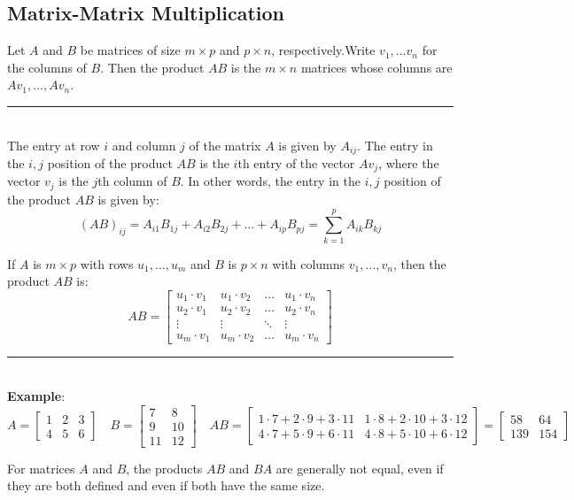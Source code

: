 \documentclass[a4paper, 9pt]{extarticle}
\begin{document}
\subsection*{Matrix-Matrix Multiplication}
\begin{definitionbox}{}{}
  Let $A$ and $B$ be matrices of size $m \times p$ and $p \times n$, respectively.Write $v_1, \ldots v_n$ for the columns of $B$. Then the product $AB$ is the $m \times n$ matrices whose columns are $Av_1 , \ldots, Av_n$.
  \\ \rule{\textwidth}{1px} \\
  The entry at row $i$ and column $j$ of the matrix $A$ is given by $A_{ij}$. The entry in the $i,j$ position of the product $AB$ is the $i$th entry of the vector $Av_j$, where the vector $v_j$ is the $j$th column of $B$. In other words, the entry in the $i,j$ position of the product $AB$ is given by:
  $$
    (AB)_{ij} = A_{i1}B_{1j} + A_{i2}B_{2j} + \ldots + A_{ip}B_{pj} = \sum_{k=1}^p A_{ik}B_{kj}
  $$
\end{definitionbox}
\begin{definitionbox}{}{}
  If $A$ is $m \times p$ with rows $u_1, \ldots, u_m$ and $B$ is $p \times n$ with columns $v_1, \ldots, v_n$, then the product $AB$ is:
  $$AB =
    \begin{bmatrix}
      u_1 \cdot v_1 & u_1 \cdot v_2 & \ldots & u_1 \cdot v_n \\
      u_2 \cdot v_1 & u_2 \cdot v_2 & \ldots & u_2 \cdot v_n \\
      \vdots        & \vdots        & \ddots & \vdots        \\
      u_m \cdot v_1 & u_m \cdot v_2 & \ldots & u_m \cdot v_n
    \end{bmatrix}
  $$
  \rule {\textwidth}{1px} \\[2ex]
  \textbf{Example}:
  $$
    A =
    \begin{bmatrix}
      1 & 2 & 3 \\
      4 & 5 & 6
    \end{bmatrix}
    \quad
    B =
    \begin{bmatrix}
      7  & 8  \\
      9  & 10 \\
      11 & 12
    \end{bmatrix}
    \quad
    AB =
    \begin{bmatrix}
      1 \cdot 7 + 2 \cdot 9 + 3 \cdot 11 & 1 \cdot 8 + 2 \cdot 10 + 3 \cdot 12 \\
      4 \cdot 7 + 5 \cdot 9 + 6 \cdot 11 & 4 \cdot 8 + 5 \cdot 10 + 6 \cdot 12
    \end{bmatrix}
    =
    \begin{bmatrix}
      58  & 64  \\
      139 & 154
    \end{bmatrix}
  $$
\end{definitionbox}
For matrices $A$ and $B$, the products $AB$ and $BA$ are generally not
equal, even if they are both defined and even if both have the same
size.
\end{document}
